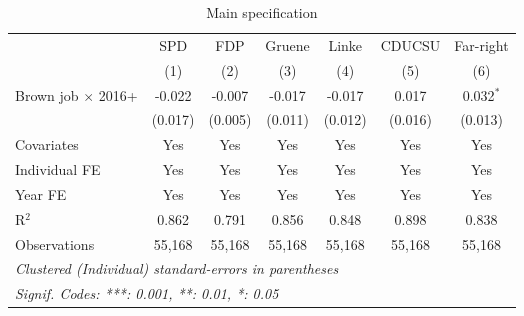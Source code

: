 
\begin{table}[htbp]
   \caption{Main specification}
   \centering
   \begin{tabular}{lcccccc}
      \tabularnewline \midrule \midrule
                                & SPD     & FDP     & Gruene  & Linke   & CDUCSU  & Far-right\\  
                                & (1)     & (2)     & (3)     & (4)     & (5)     & (6)\\  
      Brown job $\times$ 2016+  & -0.022  & -0.007  & -0.017  & -0.017  & 0.017   & 0.032$^{*}$\\   
                                & (0.017) & (0.005) & (0.011) & (0.012) & (0.016) & (0.013)\\   
      Covariates                & Yes     & Yes     & Yes     & Yes     & Yes     & Yes\\  
      Individual FE             & Yes     & Yes     & Yes     & Yes     & Yes     & Yes\\  
      Year FE                   & Yes     & Yes     & Yes     & Yes     & Yes     & Yes\\  
      R$^2$                     & 0.862   & 0.791   & 0.856   & 0.848   & 0.898   & 0.838\\  
      Observations              & 55,168  & 55,168  & 55,168  & 55,168  & 55,168  & 55,168\\  
      \midrule \midrule
      \multicolumn{7}{l}{\emph{Clustered (Individual) standard-errors in parentheses}}\\
      \multicolumn{7}{l}{\emph{Signif. Codes: ***: 0.001, **: 0.01, *: 0.05}}\\
   \end{tabular}
\end{table}



